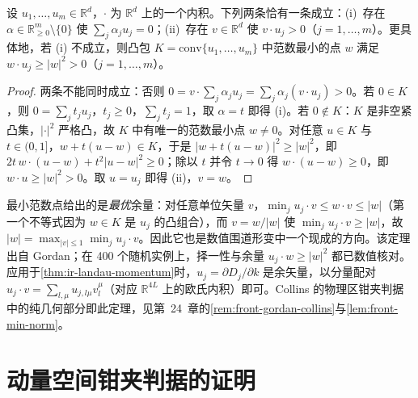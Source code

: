 \begin{lemma}\label{lem:appD-gordan}
设 $u_1,\dots,u_m\in\mathbb R^d$，$\cdot$ 为 $\mathbb R^d$ 上的一个内积。下列两条恰有一条成立：(i)~存在 $\alpha\in\mathbb R^m_{\ge0}\setminus\{0\}$ 使 $\sum_j\alpha_ju_j=0$；(ii)~存在 $v\in\mathbb R^d$ 使 $v\cdot u_j>0$（$j=1,\dots,m$）。更具体地，若 (i) 不成立，则凸包 $K=\mathrm{conv}\{u_1,\dots,u_m\}$ 中范数最小的点 $w$ 满足 $w\cdot u_j\ge|w|^2>0$（$j=1,\dots,m$）。
\end{lemma}
\begin{proof}
两条不能同时成立：否则 $0=v\cdot\sum_j\alpha_ju_j=\sum_j\alpha_j(v\cdot u_j)>0$。若 $0\in K$，则 $0=\sum_jt_ju_j$，$t_j\ge0$，$\sum_jt_j=1$，取 $\alpha=t$ 即得 (i)。若 $0\notin K$：$K$ 是非空紧凸集，$|\cdot|^2$ 严格凸，故 $K$ 中有唯一的范数最小点 $w\ne0$。对任意 $u\in K$ 与 $t\in(0,1]$，$w+t(u-w)\in K$，于是 $|w+t(u-w)|^2\ge|w|^2$，即 $2t\,w\cdot(u-w)+t^2|u-w|^2\ge0$；除以 $t$ 并令 $t\to0$ 得 $w\cdot(u-w)\ge0$，即 $w\cdot u\ge|w|^2>0$。取 $u=u_j$ 即得 (ii)，$v=w$。
\end{proof}

最小范数点给出的是\emph{最优}余量：对任意单位矢量 $v$，$\min_ju_j\cdot v\le w\cdot v\le|w|$（第一个不等式因为 $w\in K$ 是 $u_j$ 的凸组合），而 $v=w/|w|$ 使 $\min_ju_j\cdot v\ge|w|$，故 $|w|=\max_{|v|\le1}\min_ju_j\cdot v$。因此它也是数值围道形变中一个现成的方向。该定理出自 Gordan\cite{Gordan1873}；在 400 个随机实例上，择一性与余量 $u_j\cdot w\ge|w|^2$ 都已数值核对。应用于\cref{thm:ir-landau-momentum}时，$u_j=\partial D_j/\partial k$ 是余矢量，以分量配对 $u_j\cdot v=\sum_{l,\mu}u_{j,l\mu}v_l^\mu$（对应 $\mathbb R^{4L}$ 上的欧氏内积）即可。Collins 的物理区钳夹判据中的纯几何部分即此定理，见第~24~章的\cref{rem:front-gordan-collins}与\cref{lem:front-min-norm}。

\section{动量空间钳夹判据的证明}\label{sec:appD-momentum}

